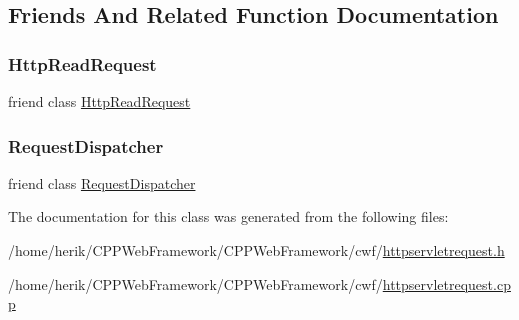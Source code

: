 \subsection{Friends And Related Function Documentation}
\mbox{\label{class_http_servlet_request_a4d54f5003e07e218070a449c22a52c7c}} 
\subsubsection{\texorpdfstring{Http\+Read\+Request}{HttpReadRequest}}
{\footnotesize\ttfamily friend class \hyperlink{class_http_read_request}{Http\+Read\+Request}\hspace{0.3cm}{\ttfamily [friend]}}

\mbox{\label{class_http_servlet_request_ae82f2dbbf52e70637edba766141fd80e}} 
\subsubsection{\texorpdfstring{Request\+Dispatcher}{RequestDispatcher}}
{\footnotesize\ttfamily friend class \hyperlink{class_request_dispatcher}{Request\+Dispatcher}\hspace{0.3cm}{\ttfamily [friend]}}



The documentation for this class was generated from the following files\+:\begin{DoxyCompactItemize}
\item 
/home/herik/\+C\+P\+P\+Web\+Framework/\+C\+P\+P\+Web\+Framework/cwf/\hyperlink{httpservletrequest_8h}{httpservletrequest.\+h}\item 
/home/herik/\+C\+P\+P\+Web\+Framework/\+C\+P\+P\+Web\+Framework/cwf/\hyperlink{httpservletrequest_8cpp}{httpservletrequest.\+cpp}\end{DoxyCompactItemize}
